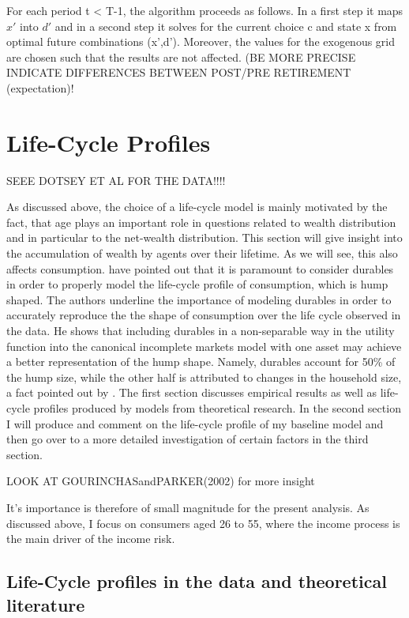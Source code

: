 \documentclass[a4paper,12pt,legno]{article}
\begin{document}
For each period t < T-1, the algorithm proceeds as follows. In a first step it maps $x'$ into $d'$ and in a second step it solves for the current choice c and state x from optimal future combinations (x',d'). Moreover, the values for the exogenous grid are chosen such that the results are not affected. (BE MORE PRECISE
INDICATE DIFFERENCES BETWEEN POST/PRE RETIREMENT (expectation)!


\section{Life-Cycle Profiles}
\label{life_cycle_profiles}


SEEE DOTSEY ET AL FOR THE DATA!!!! 

As discussed above, the choice of a life-cycle model is mainly motivated by the fact, that age plays an important role in questions related to wealth distribution and in particular to the net-wealth distribution. This section will give insight into the accumulation of wealth by agents over their lifetime. As we will see, this also affects consumption. \cite{FV&K2011} have pointed out that it is paramount to consider durables in order to properly model the life-cycle profile of consumption, which is hump shaped. The authors underline the importance of modeling durables in order to accurately reproduce the the shape of consumption over the life cycle observed in the data. He shows that including durables in a non-separable way in the utility function into the canonical incomplete markets model with one asset may achieve a better representation of the hump shape. Namely, durables account for 50\% of the hump size, while the other half is attributed to changes in the household size, a fact pointed out by \cite{attanasio1999}. The first section discusses empirical results as well as life-cycle profiles produced by models from theoretical research. In the second section I will produce and comment on the life-cycle profile of my baseline model and then go over to a more detailed investigation of certain factors in the third section. 

LOOK AT GOURINCHASandPARKER(2002) for more insight

It's importance is therefore of small magnitude for the present analysis. As discussed above, I focus on consumers aged 26 to 55, where the income process is the main driver of the income risk. 

\subsection{Life-Cycle profiles in the data and theoretical literature}
\end{document}
